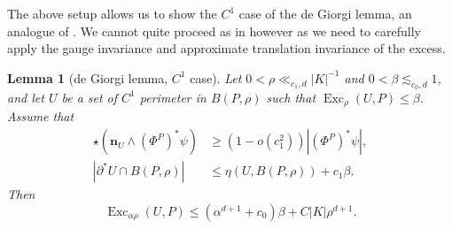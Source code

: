 \documentclass[reqno,10pt]{amsart}
\DeclareMathOperator{\Exc}{Exc}
\newcommand{\normal}{\mathbf n}
\newtheorem{lemma}[theorem]{Lemma}
\theoremstyle{definition}
\numberwithin{equation}{section}
\begin{document}
The above setup allows us to show the $C^1$ case of the de Giorgi lemma, an analogue of \cite[Lemma 6.4]{Giusti77}.
We cannot quite proceed as in \cite{Giusti77} however as we need to carefully apply the gauge invariance and approximate translation invariance of the excess.

\begin{lemma}[de Giorgi lemma, $C^1$ case]\label{Miranda44}
Let $0 < \rho \ll_{c_1, d} |K|^{-1}$ and $0 < \beta \lesssim_{c_0, d} 1$, and let $U$ be a set of $C^1$ perimeter in $B(P, \rho)$ such that $\Exc_\rho (U, P) \leq \beta$. Assume that
\begin{align}
\star(\normal_U \wedge (\Phi^P)^* \psi) &\geq (1 - o(c_1^2)) |(\Phi^P)^* \psi|, \label{Miranda44 normal hyp} \\
|\partial^* U \cap B(P, \rho)| &\leq \eta(U, B(P, \rho)) + c_1 \beta. \label{Miranda44 minimality hyp}
\end{align}
Then
\begin{equation}\label{Miranda44 concl}
\Exc_{\alpha \rho} (U, P) \leq (\alpha^{d + 1} + c_0) \beta + C|K|\rho^{d + 1}.
\end{equation}
\end{lemma}
\end{document}
